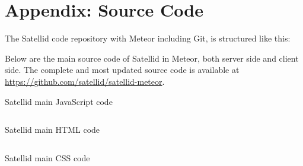 \chapter{Appendix: Source Code}
\label{apx:source-code}

The Satellid code repository with Meteor including Git, is structured like this:


\noindent Below are the main source code of Satellid in Meteor, both server side and client side.
The complete and most updated source code is available at \url{https://github.com/satellid/satellid-meteor}.

\begin{listing}[!ht]
  \caption{Satellid main JavaScript code}
  \inputminted{javascript}{\dir/code/app.js}
  \label{lst:satellid-code-js}
\end{listing}

\begin{listing}[!ht]
  \caption{Satellid main HTML code}
  \inputminted{html}{\dir/code/app.html}
  \label{lst:satellid-code-html}
\end{listing}

\begin{listing}[!ht]
  \caption{Satellid main CSS code}
  \inputminted{css}{\dir/code/app.css}
  \label{lst:satellid-code-css}
\end{listing}
